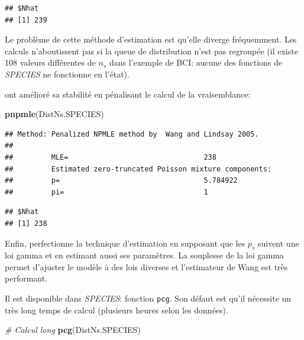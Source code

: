 \documentclass[
  11pt,
  french,
  a4paper,
  extrafontsizes,onecolumn,openright
  ]{memoir}
\newenvironment{Shaded}{\begin{snugshade}}{\end{snugshade}}
\newcommand{\CommentTok}[1]{\textcolor[rgb]{0.56,0.35,0.01}{\textit{#1}}}
\newcommand{\KeywordTok}[1]{\textcolor[rgb]{0.13,0.29,0.53}{\textbf{#1}}}
\newcommand{\NormalTok}[1]{#1}
\newlength{\rf}
\begin{document}
\begin{verbatim}
## $Nhat
## [1] 239
\end{verbatim}

\normalsize

Le problème de cette méthode d'estimation est qu'elle diverge fréquemment.
Les calculs n'aboutissent pas si la queue de distribution n'est pas regroupée (il existe 108 valeurs différentes de \(n_s\) dans l'exemple de BCI: aucune des fonctions de \emph{SPECIES} ne fonctionne en l'état).

\textcite{Wang2005} ont amélioré sa stabilité en pénalisant le calcul de la vraisemblance:

\scriptsize

\begin{Shaded}
\begin{Highlighting}[]
\KeywordTok{pnpmle}\NormalTok{(DistNs.SPECIES)}
\end{Highlighting}
\end{Shaded}

\begin{verbatim}
## Method: Penalized NPMLE method by  Wang and Lindsay 2005. 
## 
##         MLE=                                238 
##         Estimated zero-truncated Poisson mixture components:       
##         p=                                  5.784922 
##         pi=                                 1
\end{verbatim}

\begin{verbatim}
## $Nhat
## [1] 238
\end{verbatim}

\normalsize

Enfin, \textcite{Wang2010} perfectionne la technique d'estimation en supposant que les \(p_s\) suivent une loi gamma et en estimant aussi ses paramètres.
La souplesse de la loi gamma permet d'ajuster le modèle à des lois diverses et l'estimateur de Wang est très performant.

Il est disponible dans \emph{SPECIES}: fonction \texttt{pcg}.
Son défaut est qu'il nécessite un très long temps de calcul (plusieurs heures selon les données).

\scriptsize

\begin{Shaded}
\begin{Highlighting}[]
\CommentTok{# Calcul long}
\KeywordTok{pcg}\NormalTok{(DistNs.SPECIES)}
\end{Highlighting}
\end{Shaded}
\end{document}
